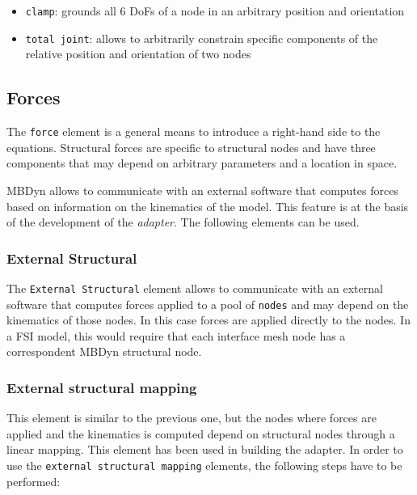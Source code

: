 \begin{itemize}
	\item \texttt{clamp}: grounds all 6 DoFs of a node in an arbitrary position and orientation
	\item \texttt{total joint}: allows to arbitrarily constrain specific components of the relative position and orientation of two nodes\cite{masarati2013formulation}
\end{itemize}


\subsection{Forces}
\label{sec:mbd-forces}

The \texttt{force} element is a general means to introduce a right-hand side to the equations. Structural forces are specific to structural
nodes and  have three components that may depend on arbitrary parameters and a location in space.

MBDyn allows to communicate with an external software that computes forces based on information on the kinematics of the model. This feature is at the basis of the development of the \textit{adapter}. The following elements can be used.


\subsubsection{External Structural}

The \texttt{External Structural} element allows to communicate with an external software that computes forces applied to a pool of \texttt{nodes} and may depend on the kinematics of those nodes. In this case forces are applied directly to the nodes. In a FSI model, this would require that each interface mesh node has a correspondent MBDyn structural node. 

\subsubsection{External structural mapping}

This element is similar to the previous one, but the nodes where forces are applied and the kinematics is computed depend on structural nodes through a linear mapping. This element has been used in building the adapter. In order to use the \texttt{external structural mapping} elements, the following steps have to be performed:

